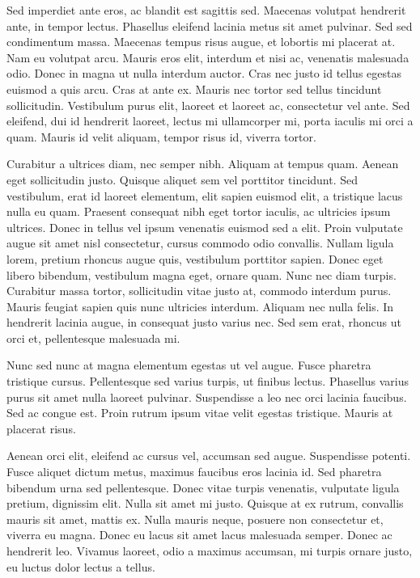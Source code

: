 \documentclass{homework}
\begin{document}
Sed imperdiet ante eros, ac blandit est sagittis sed. Maecenas volutpat hendrerit ante, in tempor lectus. Phasellus eleifend lacinia metus sit amet pulvinar. Sed sed condimentum massa. Maecenas tempus risus augue, et lobortis mi placerat at. Nam eu volutpat arcu. Mauris eros elit, interdum et nisi ac, venenatis malesuada odio. Donec in magna ut nulla interdum auctor. Cras nec justo id tellus egestas euismod a quis arcu. Cras at ante ex. Mauris nec tortor sed tellus tincidunt sollicitudin. Vestibulum purus elit, laoreet et laoreet ac, consectetur vel ante. Sed eleifend, dui id hendrerit laoreet, lectus mi ullamcorper mi, porta iaculis mi orci a quam. Mauris id velit aliquam, tempor risus id, viverra tortor.

Curabitur a ultrices diam, nec semper nibh. Aliquam at tempus quam. Aenean eget sollicitudin justo. Quisque aliquet sem vel porttitor tincidunt. Sed vestibulum, erat id laoreet elementum, elit sapien euismod elit, a tristique lacus nulla eu quam. Praesent consequat nibh eget tortor iaculis, ac ultricies ipsum ultrices. Donec in tellus vel ipsum venenatis euismod sed a elit. Proin vulputate augue sit amet nisl consectetur, cursus commodo odio convallis. Nullam ligula lorem, pretium rhoncus augue quis, vestibulum porttitor sapien. Donec eget libero bibendum, vestibulum magna eget, ornare quam. Nunc nec diam turpis. Curabitur massa tortor, sollicitudin vitae justo at, commodo interdum purus. Mauris feugiat sapien quis nunc ultricies interdum. Aliquam nec nulla felis. In hendrerit lacinia augue, in consequat justo varius nec. Sed sem erat, rhoncus ut orci et, pellentesque malesuada mi.

Nunc sed nunc at magna elementum egestas ut vel augue. Fusce pharetra tristique cursus. Pellentesque sed varius turpis, ut finibus lectus. Phasellus varius purus sit amet nulla laoreet pulvinar. Suspendisse a leo nec orci lacinia faucibus. Sed ac congue est. Proin rutrum ipsum vitae velit egestas tristique. Mauris at placerat risus.

Aenean orci elit, eleifend ac cursus vel, accumsan sed augue. Suspendisse potenti. Fusce aliquet dictum metus, maximus faucibus eros lacinia id. Sed pharetra bibendum urna sed pellentesque. Donec vitae turpis venenatis, vulputate ligula pretium, dignissim elit. Nulla sit amet mi justo. Quisque at ex rutrum, convallis mauris sit amet, mattis ex. Nulla mauris neque, posuere non consectetur et, viverra eu magna. Donec eu lacus sit amet lacus malesuada semper. Donec ac hendrerit leo. Vivamus laoreet, odio a maximus accumsan, mi turpis ornare justo, eu luctus dolor lectus a tellus.
\end{document}
